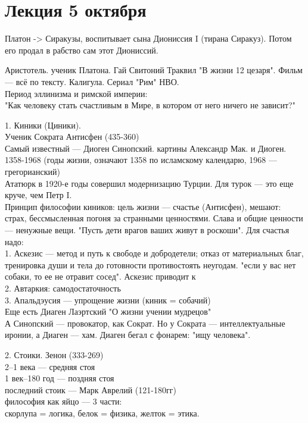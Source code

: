 \documentclass[a4paper,12pt]{article}
\begin{document}
\section{Лекция 5 октября}
Платон -> Сиракузы, воспитывает сына Диониссия I (тирана Сиракуз). Потом его продал в рабство сам этот Диониссий.

Аристотель. ученик Платона. Гай Свитоний Траквил "В жизни 12 цезаря". Фильм --- всё по тексту. Калигула. Сериал "Рим" НВО. \\
Период эллинизма и римской империи: \\
"Как человеку стать счастливым в Мире, в котором от него ничего не зависит?"

1. Киники (Циники).\\
Ученик Сократа Антисфен (435-360)\\
Самый известный --- Диоген Синопский. картины Александр Мак. и Диоген. \\
1358-1968 (годы жизни, означают 1358 по исламскому календарю, 1968 --- грегорианский)\\
Ататюрк в 1920-е годы совершил модернизацию Турции. Для турок --- это еще круче, чем Петр I.\\
Принцип философии киников: цель жизни --- счастье (Антисфен), мешают: страх, бессмысленная погоня за странными ценностями. Слава и общие ценности --- ненужные вещи. "Пусть дети врагов ваших живут в роскоши". Для счастья надо:\\
1. Аскезис --- метод и путь к свободе и добродетели; отказ от материальных благ, тренировка души и тела до готовности противостоять неугодам. "если у вас нет собаки, то ее не отравит сосед". Аскезис приводит к\\
2. Автаркия: самодостаточность\\
3. Апальдэусия --- упрощение жизни (киник = собачий)\\
Еще есть Диаген Лаэртский "О жизни учении мудрецов"\\
А Синопский --- провокатор, как Сократ. Но у Сократа --- интеллектуальные иронии, а Диаген --- хам. Диаген бегал с фонарем: "ищу человека".

2. Стоики. Зенон (333-269)\\
2--1 века --- средняя стоя\\
1 век--180 год --- поздняя стоя\\
последний стоик --- Марк Аврелий (121-180гг)\\
философия как яйцо --- 3 части:\\
скорлупа = логика, белок = физика, желток = этика.
\end{document}
